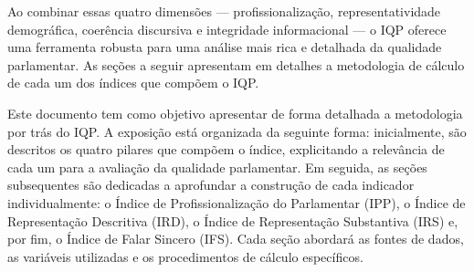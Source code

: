 Ao combinar essas quatro dimensões — profissionalização, representatividade demográfica, coerência discursiva e integridade informacional — o IQP oferece uma ferramenta robusta para uma análise mais rica e detalhada da qualidade parlamentar. As seções a seguir apresentam em detalhes a metodologia de cálculo de cada um dos índices que compõem o IQP.

Este documento tem como objetivo apresentar de forma detalhada a metodologia por trás do IQP. A exposição está organizada da seguinte forma: inicialmente, são descritos os quatro pilares que compõem o índice, explicitando a relevância de cada um para a avaliação da qualidade parlamentar. Em seguida, as seções subsequentes são dedicadas a aprofundar a construção de cada indicador individualmente: o Índice de Profissionalização do Parlamentar (IPP), o Índice de Representação Descritiva (IRD), o Índice de Representação Substantiva (IRS) e, por fim, o Índice de Falar Sincero (IFS). Cada seção abordará as fontes de dados, as variáveis utilizadas e os procedimentos de cálculo específicos.
